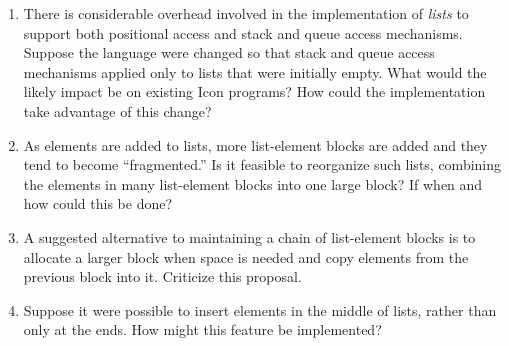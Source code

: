 \begin{enumerate}
\begin{enumerate}
\item There is considerable overhead involved in the implementation of
\textit{lists }to support both positional access and stack and queue
access mechanisms. Suppose the language were changed so that stack and
queue access mechanisms applied only to lists that were initially
empty. What would the likely impact be on existing Icon programs? How
could the implementation take advantage of this change?

\item As elements are added to lists, more list-element blocks are
added and they tend to become ``fragmented.'' Is it feasible to
reorganize such lists, combining the elements in many list-element
blocks into one large block? If when and how could this be done?

\item A suggested alternative to maintaining a chain of list-element
blocks is to allocate a larger block when space is needed and copy
elements from the previous block into it. Criticize this proposal.

\item Suppose it were possible to insert elements in the middle of
lists, rather than only at the ends. How might this feature be
implemented?

\end{enumerate}
\end{enumerate}
